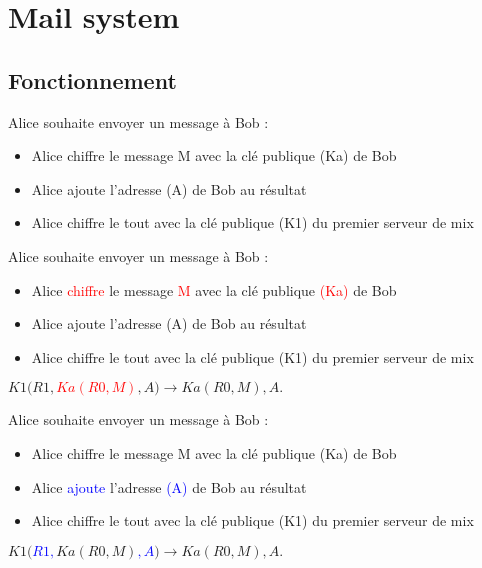 \documentclass{beamer}
\begin{document}
\section{Mail system}
\subsection{Fonctionnement}
\begin{frame}
Alice souhaite envoyer un message à Bob :
\begin{itemize}
[triangle]
\item Alice chiffre le message M avec la clé publique (Ka) de Bob
\item Alice ajoute l'adresse (A) de Bob au résultat
\item Alice chiffre le tout avec la clé publique (K1) du premier serveur de mix
\end{itemize}
\end{frame}

\begin{frame}
Alice souhaite envoyer un message à Bob :
\begin{itemize}
[triangle]
\item Alice \textcolor{red}{chiffre} le message \textcolor{red}{M} avec la clé publique \textcolor{red}{(Ka)} de Bob
\item Alice ajoute l'adresse (A) de Bob au résultat
\item Alice chiffre le tout avec la clé publique (K1) du premier serveur de mix
\end{itemize}
\begin{center}
$K1( R1, $\textcolor{red}{$Ka( R0, M )$}$, A ) \rightarrow Ka( R0, M ), A.$
\end{center}
\end{frame}

\begin{frame}
Alice souhaite envoyer un message à Bob :
\begin{itemize}
[triangle]
\item Alice chiffre le message M avec la clé publique (Ka) de Bob
\item Alice \textcolor{blue}{ajoute} l'adresse \textcolor{blue}{(A)} de Bob au résultat
\item Alice chiffre le tout avec la clé publique (K1) du premier serveur de mix
\end{itemize}
\begin{center}
$K1( $\textcolor{blue}{$R1, $}$Ka( R0, M )$\textcolor{blue}{$, A$}$ ) \rightarrow Ka( R0, M ), A.$
\end{center}
\end{frame}
\end{document}
